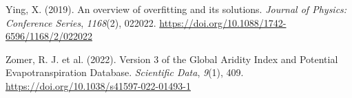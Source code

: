 \documentclass[
]{agujournal2019}
\newlength{\cslhangindent}
\newenvironment{CSLReferences}[2] %
 {\begin{list}{}{%
  \setlength{\itemindent}{0pt}
  \setlength{\leftmargin}{0pt}
  \setlength{\parsep}{0pt}
  \ifodd #1
   \setlength{\leftmargin}{\cslhangindent}
   \setlength{\itemindent}{-1\cslhangindent}
  \fi
  \setlength{\itemsep}{#2\baselineskip}}}
 {\end{list}}
\begin{document}
\begin{CSLReferences}{1}{0}
Ying, X. (2019). An overview of overfitting and its solutions.
\emph{Journal of Physics: Conference Series}, \emph{1168}(2), 022022.
\url{https://doi.org/10.1088/1742-6596/1168/2/022022}

Zomer, R. J. et al. (2022). Version 3 of the Global Aridity Index and
Potential Evapotranspiration Database. \emph{Scientific Data},
\emph{9}(1), 409. \url{https://doi.org/10.1038/s41597-022-01493-1}

\end{CSLReferences}
\end{document}

